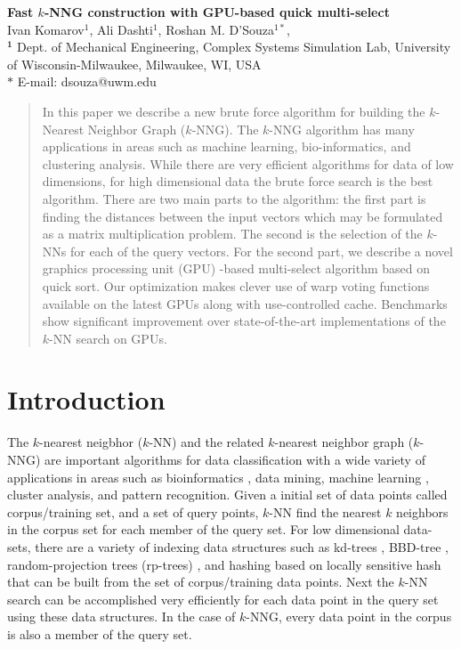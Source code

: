 \documentclass[10pt]{article}
\date{}
\begin{document}
\begin{flushleft}
{\Large
\textbf{Fast $k$-NNG construction with GPU-based quick multi-select}
}
\\
Ivan Komarov$^{1}$, Ali Dashti$^{1}$,  
Roshan M. D'Souza$^{1\ast}$, 
\\
$^{\mathbf{1}}$ Dept. of Mechanical Engineering, Complex Systems Simulation Lab, University of Wisconsin-Milwaukee, Milwaukee, WI, USA
\\
$\ast$ E-mail: dsouza@uwm.edu
\end{flushleft}
\begin{abstract}
In this paper we describe a new brute force algorithm for building the $k$-Nearest Neighbor Graph ($k$-NNG). The $k$-NNG algorithm has many applications in areas such as machine learning, bio-informatics, and clustering analysis. While there are very efficient algorithms for data of low dimensions, for high dimensional data the brute force search is the best algorithm.  There are two main parts to the algorithm: the first part is finding the distances between the input vectors which may be formulated as a matrix multiplication problem. The second is the selection of the $k$-NNs for each of the query vectors. For the second part, we describe a novel graphics processing unit (GPU) -based multi-select algorithm based on quick sort.  Our optimization makes clever use of warp voting functions available on the latest GPUs along with use-controlled cache. Benchmarks show significant improvement over state-of-the-art implementations of the $k$-NN search on GPUs. 

\end{abstract}

\section{Introduction}
The $k$-nearest neigbhor ($k$-NN) and the related $k$-nearest neighbor graph ($k$-NNG) are important algorithms for data classification with a wide variety of applications in areas such as bioinformatics \cite{Roberts:2007, Weston:2004}, data mining\cite{Zaki:2000}, machine learning \cite{Maier:2009,Liu:2010,Tenenbaum:2000}, cluster analysis\cite{Franti:2006}, and pattern recognition\cite{Duda:2001}. Given a initial set of data points called corpus/training set, and a set of query points, $k$-NN find the nearest $k$ neighbors in the corpus set for each member of the query set. For low dimensional data-sets, there are a variety of indexing data structures such as  kd-trees \cite{Jones:2011}, BBD-tree \cite{Arya:1994}, random-projection trees (rp-trees) \cite{Dasgupta:2008}, and hashing based on locally sensitive hash \cite{Datar:2004} that can be built from the set of corpus/training data points. Next the $k$-NN search can be accomplished very efficiently for each data point in the query set using these data structures.  In the case of $k$-NNG, every data point in the corpus is also a member of the query set. \\
\end{document}
